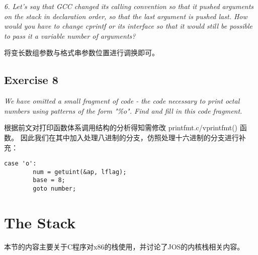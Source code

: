 \documentclass[12pt, letterpaper]{report}
\begin{document}
\textsl{6. Let's say that GCC changed its calling convention so that 
        it pushed arguments on the stack in declaration order, 
        so that the last argument is pushed last. 
        How would you have to change cprintf or its interface so that 
        it would still be possible to pass it a variable number of arguments?} \par
\quad \par 
将变长数组参数与格式串参数位置进行调换即可。


\subsection{\large Exercise 8}
\textsl{We have omitted a small fragment of code - 
        the code necessary to print octal numbers using patterns of the form 
        "\%o". Find and fill in this code fragment.} \par
\quad \par 
根据前文对打印函数体系调用结构的分析得知需修改 printfmt.c/vprintfmt() 函数。
因此我们在其中加入处理八进制的分支，仿照处理十六进制的分支进行补充：
\lstset{style=CStyle}
\setmainfont{Consolas}
\begin{lstlisting}
case 'o':
        num = getuint(&ap, lflag);
        base = 8;
        goto number;
\end{lstlisting}
\setmainfont{Times New Roman}

\section[\large The Stack]{The Stack}
本节的内容主要关于C程序对x86的栈使用，并讨论了JOS的内核栈相关内容。\par 
\end{document}
